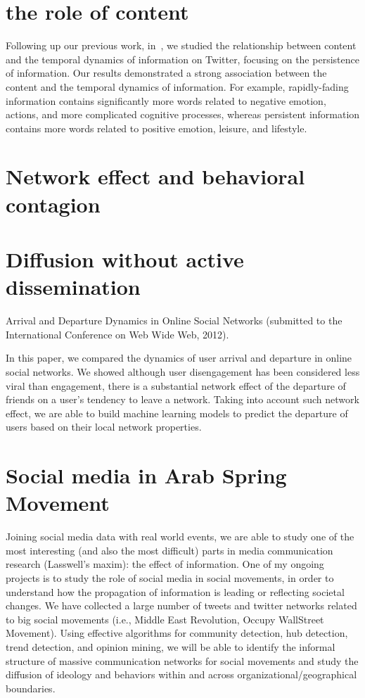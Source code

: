 \documentclass[phd,tocprelim]{cornell}
\begin{document}
\chapter{the role of content}
Following up our previous work, in~\cite{Wu-ICWSM-2011}, we studied the relationship between content and the temporal dynamics of information on Twitter, focusing on the persistence of information. Our results demonstrated a strong association between the content and the temporal dynamics of information. For example, rapidly-fading information contains significantly more words related to negative emotion, actions, and more complicated cognitive processes, whereas persistent information contains more words related to positive emotion, leisure, and lifestyle.

\chapter{Network effect and behavioral contagion}

\chapter{Diffusion without active dissemination}

Arrival and Departure Dynamics in Online Social Networks (submitted to the International Conference on Web Wide Web, 2012). 

In this paper, we compared the dynamics of user arrival and departure in online social networks. We showed although user disengagement has been considered less viral than engagement, there is a substantial network effect of the departure of friends on a user's tendency to leave a network. Taking into account such network effect, we are able to build machine learning models to predict the departure of users based on their local network properties.


\chapter{Social media in Arab Spring Movement}
    Joining social media data with real world events, we are able to study one of the most interesting (and also the most difficult) parts in media communication research (Lasswell's maxim): the effect of information. One of my ongoing projects is to study the role of social media in social movements, in order to understand how the propagation of information is leading or reflecting societal changes. We have collected a large number of tweets and twitter networks related to big social movements (i.e., Middle East Revolution, Occupy WallStreet Movement). Using effective algorithms for community detection, hub detection, trend detection, and opinion mining, we will be able to identify the informal structure of massive communication networks for social movements and study the diffusion of ideology and behaviors within and across organizational/geographical boundaries.
\end{document}
